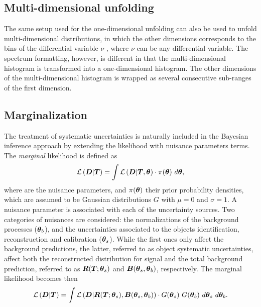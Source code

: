 \documentclass[a4paper]{article}
\begin{document}
\subsection{Multi-dimensional unfolding}
\label{subsec:unf:twodim}
The same setup used for the one-dimensional unfolding can also be used to unfold multi-dimensional distributions, in which the other dimensions
corresponds to the bins of the differential variable  $\nu$ ,
where $\nu$ can be any differential variable. The spectrum
formatting, however, is different in that the multi-dimensional
histogram is transformed into a one-dimensional histogram. The other
dimensions of the multi-dimensional histogram is wrapped as several
consecutive sub-ranges of the first dimension.


\subsection{Marginalization}
\label{sec:marginalization}
The treatment of systematic uncertainties is naturally included in the
Bayesian inference approach by extending the likelihood
\conditionalLhood{\Data{}}{\Truth{}} with nuisance parameters terms.
The {\it marginal} likelihood is defined as
\begin{equation}
\mathcal{L}\left(\boldsymbol{D}{}|\boldsymbol{T}{}\right)=
\int
\mathcal{L}\left(\boldsymbol{D}{}|\boldsymbol{T}{},\boldsymbol{\theta{}}{}\right)
\cdot{} \pi{}(\boldsymbol{\theta{}}{})
~d\boldsymbol{\theta{}}{},
\end{equation}
where \thetavec{} are the nuisance parameters, and
$\pi{}(\boldsymbol{\theta{}}{})$ their prior probability densities, which are
assumed to be Gaussian distributions $G$ with $\mu=0$ and $\sigma=1$.
A nuisance parameter is associated with each of the uncertainty sources. 
Two categories of nuisances are considered: 
the normalizations of the background processes
($\boldsymbol{\theta{}}{}_b$), and the uncertainties associated to the objects
identification, reconstruction and calibration ($\boldsymbol{\theta{}}{}_s$).
While the first ones only affect the background predictions, the
latter, referred to as object systematic uncertainties, affect both the
reconstructed distribution for signal and
the total background prediction, referred to as
$\boldsymbol{R}{}(\boldsymbol{T}{};\boldsymbol{\theta{}}{}_s)$ and
$\boldsymbol{B}{}(\boldsymbol{\theta{}}{}_s,\boldsymbol{\theta{}}{}_b)$, respectively.
The marginal likelihood becomes then
\begin{equation}
\label{eq:marginalLhood}
\mathcal{L}\left(\boldsymbol{D}{}|\boldsymbol{T}{}\right)=
\int
\mathcal{L}\left(\boldsymbol{D}{}|\boldsymbol{R}{}(\boldsymbol{T}{};\boldsymbol{\theta{}}{}_s),\boldsymbol{B}{}(\boldsymbol{\theta{}}{}_s,\boldsymbol{\theta{}}{}_b)\right)
\cdot{} G(\boldsymbol{\theta{}}{}_s) ~G(\boldsymbol{\theta{}}{}_b)
~d\boldsymbol{\theta{}}{}_s ~d\boldsymbol{\theta{}}{}_b.
\end{equation}
\end{document}
